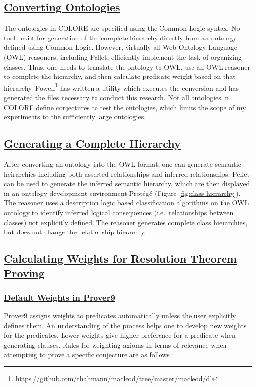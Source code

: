 \documentclass{article}
\begin{document}
\subsection{\underline{Converting Ontologies}}
The ontologies in COLORE are specified using the Common Logic syntax. No tools exist for generation of the complete hierarchy directly from an ontology defined using Common Logic. However, virtually all Web Ontology Language (OWL) reasoners, including Pellet, efficiently implement the task of organizing classes. Thus, one needs to translate the ontology to OWL, use an OWL reasoner to complete the hierarchy, and then calculate predicate weight based on that hierarchy. Powell\footnote{\url{https://github.com/thahmann/macleod/tree/master/macleod/dl}} has written a utility which executes the conversion and has generated the files necessary to conduct this research. Not all ontologies in COLORE define conjectures to test the ontologies, which limits the scope of my experiments to the sufficiently large ontologies. 

\subsection{\underline{Generating a Complete Hierarchy}}
After converting an ontology into the OWL format, one can generate semantic heirarchies including both asserted relationships and inferred relationships. Pellet can be used to generate the inferred semantic hierarchy, which are then displayed in an ontology development environment
 Prot{\'e}g{\'e} \cite{gennari2003evolution} (Figure \ref{fig:class-hierarchy}). The reasoner uses a description logic based classification algorithms on the OWL ontology to identify inferred logical consequences (i.e.~relationships between classes) not explicitly defined. The reasoner generates complete class hierarchies, but does not change the relationship hierarchy.

\subsection{\underline{Calculating Weights for Resolution Theorem Proving}}
\subsubsection{\underline{Default Weights in Prover9}}
Prover9 assigns weights to predicates automatically unless the user explicitly defines them. An understanding of the process helps one to develop new weights for the predicates. Lower weights give higher preference for a predicate when generating clauses. Rules for weighting axioms in terms of relevance when attempting to prove a specific conjecture are as follows \cite{mccune2005prover9}: 
\end{document}
